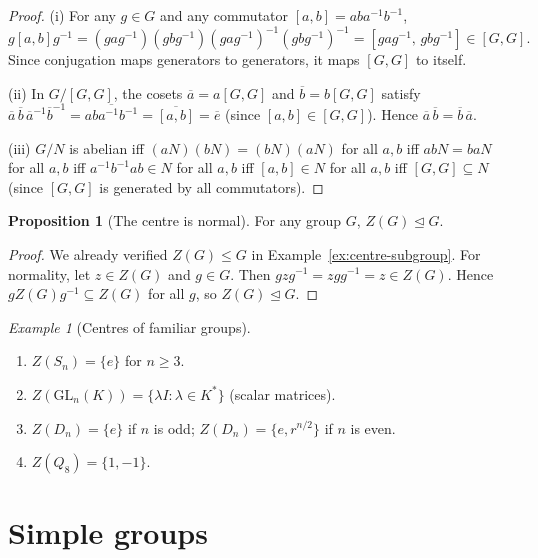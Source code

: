 \documentclass[12pt,a4paper,openany]{book}
\theoremstyle{definition}
\newtheorem{proposition}{Proposition}[chapter]
\theoremstyle{remark}
\newtheorem{example}{Example}[chapter]
\begin{document}
\begin{proof}
(i) For any $g\in G$ and any commutator $[a,b]=aba^{-1}b^{-1}$,
\[
  g[a,b]g^{-1} = (gag^{-1})(gbg^{-1})(gag^{-1})^{-1}(gbg^{-1})^{-1}
  = [gag^{-1},\,gbg^{-1}] \in [G,G].
\]
Since conjugation maps generators to generators, it maps $[G,G]$ to
itself.

(ii) In $G/[G,G]$, the cosets $\overline{a}=a[G,G]$ and
$\overline{b}=b[G,G]$ satisfy
$\overline{a}\,\overline{b}\,\overline{a}^{-1}\overline{b}^{-1}
=\overline{aba^{-1}b^{-1}} = \overline{[a,b]}=\overline{e}$ (since
$[a,b]\in[G,G]$).  Hence $\overline{a}\,\overline{b}=
\overline{b}\,\overline{a}$.

(iii) $G/N$ is abelian iff $(aN)(bN)=(bN)(aN)$ for all $a,b$ iff
$abN=baN$ for all $a,b$ iff $a^{-1}b^{-1}ab\in N$ for all $a,b$ iff
$[a,b]\in N$ for all $a,b$ iff $[G,G]\subseteq N$ (since $[G,G]$ is
generated by all commutators).
\end{proof}

\begin{proposition}[The centre is normal]
\label{prop:centre-normal}
For any group $G$, $Z(G)\trianglelefteq G$.
\end{proposition}

\begin{proof}
We already verified $Z(G)\le G$ in Example~\ref{ex:centre-subgroup}.  For
normality, let $z\in Z(G)$ and $g\in G$.  Then $gzg^{-1}=zgg^{-1}=z\in
Z(G)$.  Hence $gZ(G)g^{-1}\subseteq Z(G)$ for all $g$, so
$Z(G)\trianglelefteq G$.
\end{proof}

\begin{example}[Centres of familiar groups]
\label{ex:centres}
\begin{enumerate}[label=(\roman*)]
  \item $Z(S_n)=\{e\}$ for $n\ge 3$.
  \item $Z(\text{GL}_n(K))=\{\lambda I : \lambda\in K^*\}$ (scalar
    matrices).
  \item $Z(D_n)=\{e\}$ if $n$ is odd; $Z(D_n)=\{e,r^{n/2}\}$ if $n$ is
    even.
  \item $Z(Q_8)=\{1,-1\}$.
\end{enumerate}
\end{example}

\section{Simple groups}
\label{sec:ch2-simple}
\end{document}
